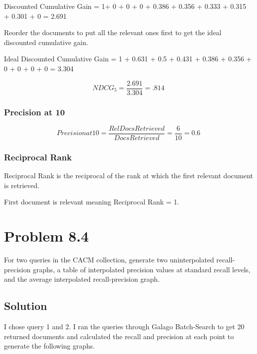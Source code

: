 \documentclass[letterpaper,12pt]{article}
\begin{document}
Discounted Cumulative Gain = 1+ 0 + 0 + 0 + 0.386 + 0.356 + 0.333 + 0.315 + 0.301 + 0 = 2.691

Reorder the documents to put all the relevant ones first to get the ideal discounted cumulative gain.

Ideal Discounted Cumulative Gain = 1 +  0.631 + 0.5 + 0.431 + 0.386 + 0.356 + 0 + 0 + 0 + 0 = 3.304

$$NDCG_5 = \frac{ 2.691 }{ 3.304} = .814 $$


\subsubsection{Precision at 10}

$$Precision at 10 = \frac{Rel Docs Retrieved}{Docs Retrieved} = \frac{6}{10} = 0.6 $$

\subsubsection{Reciprocal Rank}
Reciprocal Rank is the reciprocal of the rank at which the first relevant document is retrieved.

First document is relevant meaning Reciprocal Rank = 1.


\pagebreak

\section{Problem 8.4}
For two queries in the CACM collection, generate two uninterpolated recall-precision graphs, a table of interpolated precision values at standard recall levels, and the average interpolated recall-precision graph.

\subsection{Solution}

I chose query 1 and 2. I ran the queries through Galago Batch-Search to get 20 returned documents and calculated the recall and precision at each point to generate the following graphs.
\end{document}

